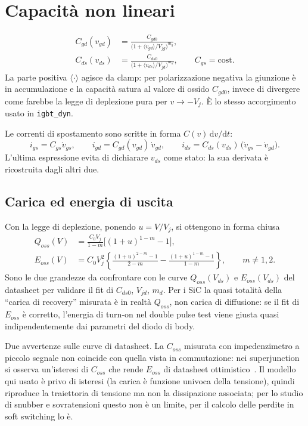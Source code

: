\documentclass[11pt,a4paper]{article}
\newcommand{\ssc}[1]{\texttt{#1}}
\newcommand{\ud}{\mathrm{d}}
\begin{document}
\section{Capacità non lineari}

\begin{align}
  C_{gd}(v_{gd}) &= \frac{C_{gd0}}{\big(1+\langle v_{gd}\rangle/V_{jg}\big)^{m_g}},
  \label{eq:cgd}\\[2mm]
  C_{ds}(v_{ds}) &= \frac{C_{ds0}}{\big(1+\langle v_{ds}\rangle/V_{jd}\big)^{m_d}},
  \qquad C_{gs}=\text{cost.}
\end{align}
La parte positiva $\langle\cdot\rangle$ agisce da clamp: per polarizzazione
negativa la giunzione è in accumulazione e la capacità satura al valore di
ossido $C_{gd0}$, invece di divergere come farebbe la legge di deplezione
pura per $v\to -V_j$. È lo stesso accorgimento usato in \ssc{igbt\_dyn}.

Le correnti di spostamento sono scritte in forma $C(v)\,\ud v/\ud t$:
\begin{equation}
  i_{gs}=C_{gs}\dot v_{gs},\qquad
  i_{gd}=C_{gd}(v_{gd})\,\dot v_{gd},\qquad
  i_{ds}=C_{ds}(v_{ds})\,\big(\dot v_{gs}-\dot v_{gd}\big).
\end{equation}
L'ultima espressione evita di dichiarare $v_{ds}$ come stato: la sua
derivata è ricostruita dagli altri due.

\subsection{Carica ed energia di uscita}

Con la legge di deplezione, ponendo $u=V/V_j$, si ottengono in forma chiusa
\begin{align}
  Q_{oss}(V)&=\frac{C_0 V_j}{1-m}\Big[(1+u)^{1-m}-1\Big], \\
  E_{oss}(V)&=C_0V_j^2\left\{\frac{(1+u)^{2-m}-1}{2-m}-\frac{(1+u)^{1-m}-1}{1-m}\right\},
  \qquad m\neq 1,2 .
\end{align}
Sono le due grandezze da confrontare con le curve $Q_{oss}(V_{ds})$ e
$E_{oss}(V_{ds})$ del datasheet per validare il fit di $C_{ds0}$, $V_{jd}$,
$m_d$. Per i SiC la quasi totalità della ``carica di recovery'' misurata è in
realtà $Q_{oss}$, non carica di diffusione: se il fit di $E_{oss}$ è corretto,
l'energia di turn-on nel double pulse test viene giusta quasi
indipendentemente dai parametri del diodo di body.

\medskip
\noindent Due avvertenze sulle curve di datasheet. La $C_{oss}$ misurata con
impedenzimetro a piccolo segnale non coincide con quella vista in commutazione:
nei superjunction si osserva un'isteresi di $C_{oss}$ che rende $E_{oss}$ di
datasheet ottimistico~\cite{Fedison2014,Fedison2016,Roig2015}. Il modello qui
usato è privo di isteresi (la carica è funzione univoca della tensione), quindi
riproduce la traiettoria di tensione ma non la dissipazione associata; per lo
studio di snubber e sovratensioni questo non è un limite, per il calcolo delle
perdite in soft switching lo è.
\end{document}
